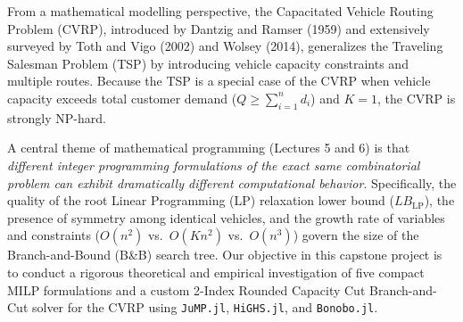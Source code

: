 \documentclass[11pt,a4paper]{article}
\begin{document}
From a mathematical modelling perspective, the Capacitated Vehicle Routing Problem (CVRP), introduced by Dantzig and Ramser (1959) and extensively surveyed by Toth and Vigo (2002) and Wolsey (2014), generalizes the Traveling Salesman Problem (TSP) by introducing vehicle capacity constraints and multiple routes. Because the TSP is a special case of the CVRP when vehicle capacity exceeds total customer demand ($Q \ge \sum_{i=1}^n d_i$) and $K = 1$, the CVRP is strongly NP-hard.

A central theme of mathematical programming (Lectures 5 and 6) is that \emph{different integer programming formulations of the exact same combinatorial problem can exhibit dramatically different computational behavior}. Specifically, the quality of the root Linear Programming (LP) relaxation lower bound ($LB_{\text{LP}}$), the presence of symmetry among identical vehicles, and the growth rate of variables and constraints ($O(n^2)$ vs.\ $O(K n^2)$ vs.\ $O(n^3)$) govern the size of the Branch-and-Bound (B\&B) search tree. Our objective in this capstone project is to conduct a rigorous theoretical and empirical investigation of five compact MILP formulations and a custom 2-Index Rounded Capacity Cut Branch-and-Cut solver for the CVRP using \texttt{JuMP.jl}, \texttt{HiGHS.jl}, and \texttt{Bonobo.jl}.
\end{document}
